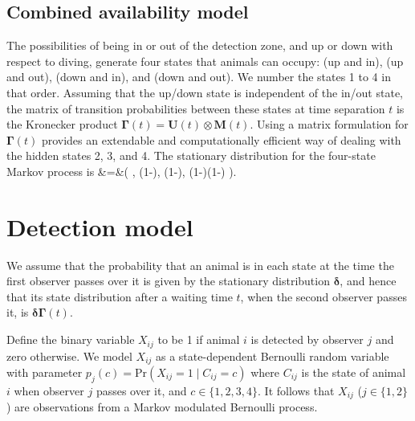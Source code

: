 \documentclass[useAMS, usenatbib, referee]{biom}\usepackage[]{graphicx}\usepackage[]{color}
\begin{document}
\subsection{Combined availability model}


The possibilities of being in or out of the detection zone, and up or down with respect to diving, generate four states that animals can occupy: (up and in), (up and out), (down and in), and (down and out). We number the states 1 to 4 in that order. Assuming that the up/down state is independent of the in/out state, the matrix of transition probabilities between these states at time separation $t$ is the Kronecker product $\bm{\Gamma}(t)=\bm{U}(t)\otimes\bm{M}(t)$. Using a matrix formulation for $\bm{\Gamma}(t)$ provides an extendable and computationally efficient way of dealing with the hidden states 2, 3, and 4. The stationary distribution for the four-state Markov process is
\be
\bm{\delta}&=&\Bigg(
\gamma{},\;
\gamma\left(1-\right),\;
\left(1-\gamma\right),\;
\left(1-\gamma\right)\left(1-\right)
\Bigg).
\label{eq:delta}
\ee



\section{Detection model}

We assume that the probability that an animal is in each state at the time the first observer passes over it is given by the stationary distribution $\bm{\delta}$, and hence that its state distribution after a waiting time $t$, when the second observer passes it, is $\bm{\delta}\bm{\Gamma}(t)$.

Define the binary variable $X_{ij}$ to be 1 if animal $i$ is detected by observer $j$ and zero otherwise. We model $X_{ij}$ as a state-dependent Bernoulli random variable with parameter $p_j(c)=\mbox{Pr}(X_{ij}=1\mid C_{ij}=c)$ where $C_{ij}$ is the state of animal $i$ when observer $j$ passes over it, and $c\in \{1,2,3,4\}$.
It follows that $X_{ij}$ ($j \in \{1, 2\}$) are observations from a Markov modulated Bernoulli process. %


\end{document}
